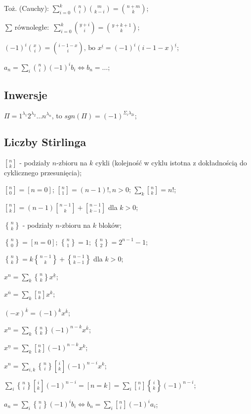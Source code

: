 \entry
Toż. (Cauchy): $\sum^k_{i=0}\binom{n}{i}\binom{m}{k - i} = \binom{n + m}{k}$;

\entry
$\text{$\sum$ równoległe: } \sum^k_{i=0} \binom{y + i}{i} =
  \binom{y + k + 1}{k}$;

\entry
$(-1)^i\binom{x}{i} = \binom{i - 1 - x}{i} \text{, bo }  x^{\underline{i}} =
  (-1)^i(i - 1 - x)^{\underline{i}}$;

\entry
$a_n = \sum_i\binom{n}{i}(-1)^i b_i \iff b_n = \dots$;

\subsection{Inwersje}

\entry
$\Pi = 1^{\lambda_1}2^{\lambda_2}\dots n^{\lambda_n}$, to $sgn(\Pi) =
  (-1)^{\Sigma_i\lambda_{2i}}$;

\subsection{Liczby Stirlinga}

\entry
${n \brack k}$ - podziały $n$-zbioru na $k$ cykli (kolejność w cyklu istotna z
  dokładnością do cyklicznego przesunięcia);

\entry
${n \brack 0} = [ n = 0 ]$;
\entry
${n \brack 1} = (n - 1)!, n > 0$;
\entry
$\sum_k{n \brack k} = n!$;

\entry
${n \brack k} = (n-1){n-1 \brack k}+{n-1 \brack k-1}$ dla ${k > 0}$;

\entry
${n \brace k}$ - podziały $n$-zbioru na $k$ bloków;

\entry
${n \brace 0} = [n = 0]$;
\entry
${n \brace 1} = 1$;
\entry
${n \brace 2} = 2^{n-1}-1$;

\entry
${n \brace k} = k{n-1 \brace k} + {n-1 \brace k-1}$ dla ${k > 0}$;

\entry
$x^n = \sum_k{n \brace k} x^{\underline{k}}$;

\entry
$x^{\overline{n}} = \sum_k{n \brack k}x^k$;

\entry
$(-x)^{\overline{k}} = (-1)^kx^{\overline{k}}$;

\entry
$x^n = \sum_k {n \brace k} (-1)^{n-k} x^{\overline{k}}$;

\entry
$x^{\underline{n}} = \sum_k {n \brack k} (-1)^{n-k} x^{k}$;

\entry
$x^n = \sum_{i,k} {n \brace i}{i \brack k}(-1)^{n-i}x^k$;

\entry
$\sum_i{n \brace i}{i \brack k}(-1)^{n-i} = [n=k] =
  \sum_i{n \brack i}{i \brace k}(-1)^{n-i}$;

\entry
$a_n = \sum_i{n \brace i}(-1)^ib_i \iff b_n = \sum_i{n \brack i}(-1)^ia_i$;
